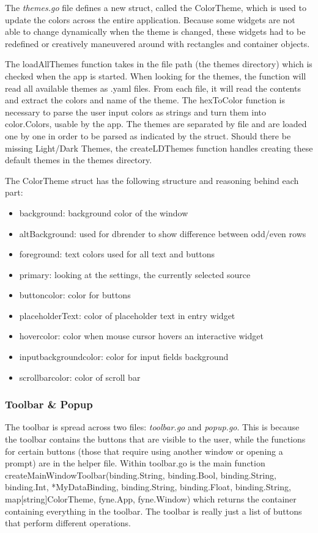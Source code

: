 The \textit{themes.go} file defines a new struct, called the
ColorTheme, which is used to update the colors across the entire
application. Because some widgets are not able to change dynamically
when the theme is changed, these widgets had to be redefined or
creatively maneuvered around with rectangles and container objects.

The loadAllThemes function takes in the file path (the themes
directory) which is checked when the app is started. When looking for
the themes, the function will read all available themes as .yaml
files. From each file, it will read the contents and
extract the colors and name of the theme.
The hexToColor function is necessary to
parse the user input colors as strings and turn them into
color.Colors, usable by the app.
The themes are separated by file and are loaded one by one in order
to be parsed as indicated by the struct. Should there be missing
Light/Dark Themes, the createLDThemes function handles creating these
default themes in the themes directory.

The ColorTheme struct has the following structure and reasoning
behind each part:
\begin{itemize}
	\item background: background color of the window
	\item altBackground: used for dbrender to show difference between odd/even rows
	\item foreground: text colors used for all text and buttons
	\item primary: looking at the settings, the currently selected source
	\item buttoncolor: color for buttons
	\item placeholderText: color of placeholder text in entry widget
	\item hovercolor: color when mouse cursor hovers an interactive widget
	\item inputbackgroundcolor: color for input fields background
	\item scrollbarcolor: color of scroll bar
\end{itemize}

\subsubsection{Toolbar \& Popup}
\label{subsubsec:ToolPop}

The toolbar is spread across two files: \textit{toolbar.go} and
\textit{popup.go}. This is because the toolbar contains the buttons
that are visible to the user, while the functions for certain buttons
(those that require using another window or opening a prompt) are in
the helper file.
Within toolbar.go is the main function
createMainWindowToolbar(binding.String, binding.Bool, binding.String,
	binding.Int, *MyDataBinding, binding.String, binding.Float,
binding.String, map[string]ColorTheme, fyne.App, fyne.Window) which
returns the container containing everything in the toolbar.
The toolbar is really just a list of buttons that perform different operations.

